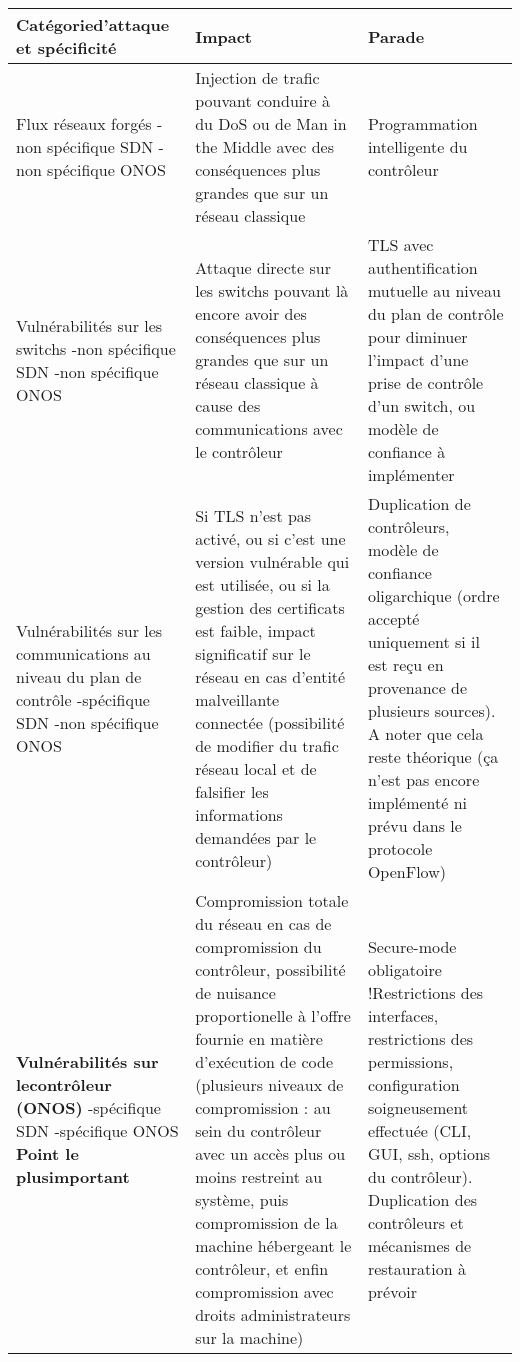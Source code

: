 \begin{small}

\begin{longtable}{| p{} | p{} | p{}|}

\hline
\textbf{Catégorie\newline d'attaque et spécificité} & \textbf{Impact} & \textbf{Parade} \\
\hline
Flux réseaux forgés \newline -non spécifique SDN \newline -non spécifique ONOS & Injection de trafic pouvant conduire à du DoS ou de Man in the Middle avec des conséquences plus grandes que sur un réseau classique & Programmation intelligente du contrôleur\\ 
\hline
Vulnérabilités sur les \newline switchs \newline -non spécifique SDN \newline -non spécifique ONOS & Attaque directe sur les switchs pouvant là encore avoir des conséquences plus grandes que sur un réseau classique à cause des communications avec le contrôleur & TLS avec authentification mutuelle au niveau du plan de contrôle pour diminuer l'impact d'une prise de contrôle d'un switch, ou modèle de confiance à implémenter\\ 
\hline
Vulnérabilités sur les communications au niveau du plan de contrôle \newline -spécifique SDN \newline -non spécifique ONOS &  Si TLS n'est pas activé, ou si c'est une version vulnérable qui est utilisée, ou si la gestion des certificats est faible, impact significatif sur le réseau en cas d'entité malveillante connectée (possibilité de modifier du trafic réseau local et de falsifier les informations demandées par le contrôleur) & Duplication de contrôleurs, modèle de confiance oligarchique (ordre accepté uniquement si il est reçu en provenance de plusieurs sources). A noter que cela reste théorique (ça n'est pas encore implémenté ni prévu dans le protocole OpenFlow)\\ 
\hline
\textbf{Vulnérabilités sur le\newline contrôleur (ONOS)} \newline -spécifique SDN \newline -spécifique ONOS \newline \newline \textbf{Point le plus\newline important} & Compromission totale du réseau en cas de compromission du contrôleur, possibilité de nuisance proportionelle à l'offre fournie en matière d'exécution de code (plusieurs niveaux de compromission : au sein du contrôleur avec un accès plus ou moins restreint au système, puis compromission de la machine hébergeant le contrôleur, et enfin compromission avec droits administrateurs sur la machine)  & Secure-mode obligatoire !\newline Restrictions des interfaces, restrictions des permissions, configuration soigneusement effectuée (CLI, GUI, ssh, options du contrôleur). Duplication des contrôleurs et mécanismes de restauration à prévoir\\ 

\end{longtable}
\end{small}
